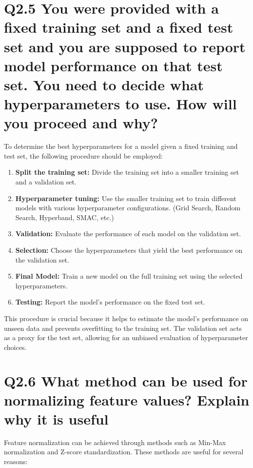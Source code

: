 \documentclass[11pt]{article}
\begin{document}
\section*{Q2.5 You were provided with a fixed training set and a fixed test set and you are supposed to report model performance on that test set. You need to decide what hyperparameters to use. How will you proceed and why?}

To determine the best hyperparameters for a model given a fixed training and test set, the following procedure should be employed:

\begin{enumerate}
    \item \textbf{Split the training set:} Divide the training set into a smaller training set and a validation set.
    \item \textbf{Hyperparameter tuning:} Use the smaller training set to train different models with various hyperparameter configurations. (Grid Search, Random Search, Hyperband, SMAC, etc.)
    \item \textbf{Validation:} Evaluate the performance of each model on the validation set.
    \item \textbf{Selection:} Choose the hyperparameters that yield the best performance on the validation set.
    \item \textbf{Final Model:} Train a new model on the full training set using the selected hyperparameters.
    \item \textbf{Testing:} Report the model's performance on the fixed test set.
\end{enumerate}

This procedure is crucial because it helps to estimate the model's performance on unseen data and prevents overfitting to the training set. The validation set acts as a proxy for the test set, allowing for an unbiased evaluation of hyperparameter choices.

\section*{Q2.6 What method can be used for normalizing feature values? Explain why it is useful}

Feature normalization can be achieved through methods such as Min-Max normalization and Z-score standardization. These methods are useful for several reasons:
\end{document}

